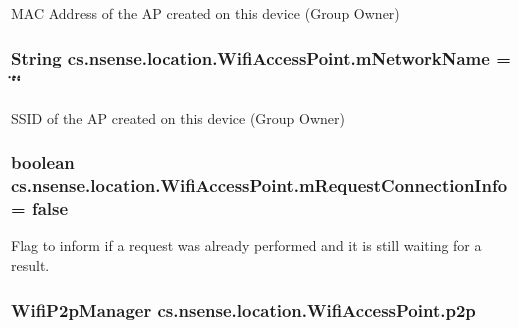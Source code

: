 M\-A\-C Address of the A\-P created on this device (Group Owner) \hypertarget{classcs_1_1nsense_1_1location_1_1_wifi_access_point_a7d81aef9c608578a5089b12737791daa}{
\subsubsection[{m\-Network\-Name}]{\setlength{\rightskip}{0pt plus 5cm}String cs.\-nsense.\-location.\-Wifi\-Access\-Point.\-m\-Network\-Name = \char`\"{}\char`\"{}\hspace{0.3cm}{\ttfamily [private]}}}\label{classcs_1_1nsense_1_1location_1_1_wifi_access_point_a7d81aef9c608578a5089b12737791daa}
S\-S\-I\-D of the A\-P created on this device (Group Owner) \hypertarget{classcs_1_1nsense_1_1location_1_1_wifi_access_point_a766fd29223240520eb9b81a7e73311ce}{
\subsubsection[{m\-Request\-Connection\-Info}]{\setlength{\rightskip}{0pt plus 5cm}boolean cs.\-nsense.\-location.\-Wifi\-Access\-Point.\-m\-Request\-Connection\-Info = false\hspace{0.3cm}{\ttfamily [private]}}}\label{classcs_1_1nsense_1_1location_1_1_wifi_access_point_a766fd29223240520eb9b81a7e73311ce}
Flag to inform if a request was already performed and it is still waiting for a result. \hypertarget{classcs_1_1nsense_1_1location_1_1_wifi_access_point_ae018617cf17ec65327469831a5422ebf}{
\subsubsection[{p2p}]{\setlength{\rightskip}{0pt plus 5cm}Wifi\-P2p\-Manager cs.\-nsense.\-location.\-Wifi\-Access\-Point.\-p2p\hspace{0.3cm}{\ttfamily [private]}}}\label{classcs_1_1nsense_1_1location_1_1_wifi_access_point_ae018617cf17ec65327469831a5422ebf}
